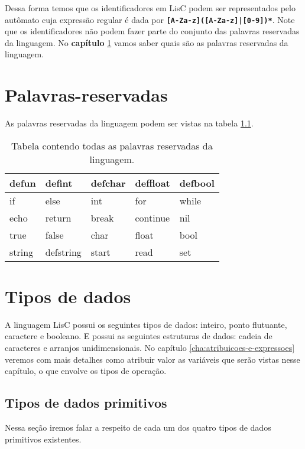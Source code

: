 \documentclass[
  12pt,				%
  oneside,			%
  a4paper,			%
  english,			%
  french,				%
  spanish,			%
  brazil,				%
]{abntex2}
\begin{document}
Dessa forma temos que os identificadores em LisC podem ser representados pelo
autômato cuja expressão regular é dada por
\textbf{\lstinline[]{[A-Za-z]([A-Za-z]|[0-9])*}}. Note que os
identificadores não podem fazer parte do conjunto das palavras
reservadas da linguagem. No \textbf{capítulo}
\ref{cha:palavras-reservadas} vamos saber quais são as palavras
reservadas da linguagem.

\chapter{Palavras-reservadas}
\label{cha:palavras-reservadas}
As palavras reservadas da linguagem podem ser vistas na tabela
\ref{tab:palavras-reservadas}.

\begin{table}[H]
  \centering
  \begin{tabular}{|l|l|l|l|l|}
    \hline
    defun & defint & defchar & deffloat & defbool \\ \hline
    if&  else& int &  for& while \\ \hline
    echo&  return&  break&  continue& nil \\ \hline
    true&  false& char& float & bool\\ \hline
    string&  defstring& start& read & set\\ \hline
  \end{tabular}
  \caption{Tabela contendo todas as palavras reservadas da linguagem.}
  \label{tab:palavras-reservadas}
\end{table}

\chapter{Tipos de dados}
\label{cha:tipos-de-dados}

A linguagem LisC possui os seguintes tipos de dados: inteiro, ponto
flutuante, caractere e booleano. E possui as seguintes estruturas de
dados: cadeia de caracteres e arranjos unidimensionais. No capítulo
\ref{cha:atribuicoes-e-expressoes} veremos com mais detalhes
como atribuir valor as variáveis que serão vistas nesse capítulo, o
que envolve os tipos de operação.

\section{Tipos de dados primitivos}
\label{sec:tipos-de-dados-primitivos}

Nessa seção iremos falar a respeito de cada um dos quatro tipos de
dados primitivos existentes.
\end{document}
